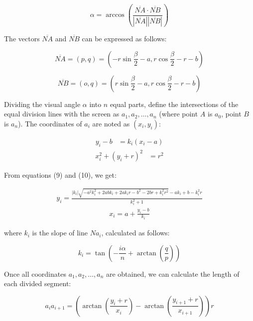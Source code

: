 \begin{equation}
\alpha = \arccos \left( \frac{\overline{NA} \cdot \overline{NB}}{|\overline{NA}||\overline{NB}|} \right)
\end{equation}

The vectors \( \overline{NA} \) and \( \overline{NB} \) can be expressed as follows:

\begin{equation}
\overline{NA} = (p, q) = \left( -r \sin \frac{\beta}{2} - a, r \cos \frac{\beta}{2} - r - b \right) 
\end{equation}

\begin{equation}
\overline{NB} = (o, q) = \left( r \sin \frac{\beta}{2} - a, r \cos \frac{\beta}{2} - r - b \right)
\end{equation}

Dividing the visual angle \( \alpha \) into \( n \) equal parts, define the intersections of the equal division lines with the screen as \( a_1, a_2, \ldots, a_n \) (where point \( A \) is \( a_0 \), point \( B \) is \( a_n \)). The coordinates of \( a_i \) are noted as \( (x_i, y_i) \):

\begin{align}
    y_i - b &= k_i(x_i - a)
\end{align}
\begin{align}
    x_i^2 + (y_i + r)^2 &= r^2 
\end{align}

From equations (9) and (10), we get:

\begin{align}
y_i = \frac{|k_i| \sqrt{-a^2k_i^2 + 2abk_i + 2ak_ir - b^2 - 2br + k_i^2r^2} - ak_i + b - k_i^2r}{k_i^2 + 1} 
\end{align}
\begin{align}
    x_i = a + \frac{y_i - b}{k_i}
\end{align}

where \( k_i \) is the slope of line \( N a_i \), calculated as follows:

\begin{equation}
k_i = \tan \left( -\frac{i \alpha}{n} + \arctan \left( \frac{q}{p} \right) \right) 
\end{equation}

Once all coordinates \( a_1, a_2, \ldots, a_n \) are obtained, we can calculate the length of each divided segment:

\begin{equation}
a_i a_{i+1} = \left( \arctan \left( \frac{y_i + r}{x_i} \right) - \arctan \left( \frac{y_{i+1} + r}{x_{i+1}} \right) \right) r 
\end{equation}

